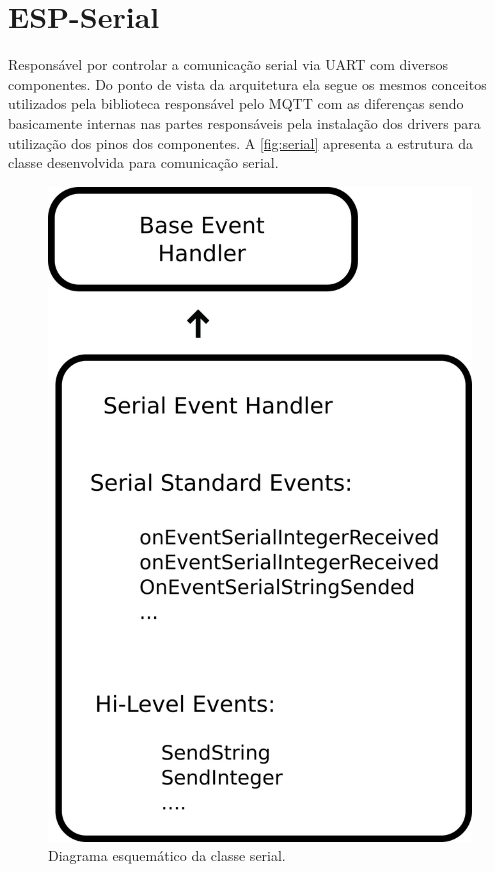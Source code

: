 \section{ESP-Serial}

Responsável por controlar a comunicação serial via \ac{UART} com diversos componentes. Do ponto de vista da arquitetura
ela segue os mesmos conceitos utilizados pela biblioteca responsável pelo \ac{MQTT} com as diferenças sendo basicamente
internas nas partes responsáveis pela instalação dos drivers para utilização dos pinos dos componentes. A \autoref{fig:serial}
apresenta a estrutura da classe desenvolvida para comunicação serial. 

\begin{figure}[htb]
    \begin{center}
	    \includegraphics[scale=0.5]{figs/serial-dia.png}
	\end{center}
	\caption{\label{fig:serial} Diagrama esquemático da classe serial.} 
\end{figure}

